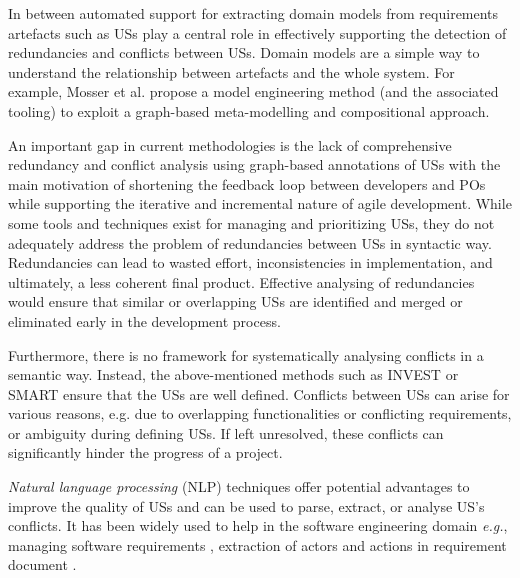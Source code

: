 
In between automated support for extracting domain models from requirements artefacts such as USs play a central role in effectively supporting the detection of redundancies and conflicts between USs. Domain models are a simple way to understand the relationship between artefacts and the whole system. For example, Mosser et al. propose a model engineering method (and the associated tooling) to exploit a graph-based meta-modelling and compositional approach\cite{mosser2022modelling}.

An important gap in current methodologies is the lack of comprehensive redundancy and conflict analysis using graph-based annotations of USs with the main motivation of shortening the feedback loop between developers and POs while supporting the iterative and incremental nature of agile development.
While some tools and techniques exist for managing and prioritizing USs\cite{sachdeva2018prioritizing}\cite{abdelazim2020framework}, they do not adequately address the problem of redundancies between USs in syntactic way. Redundancies can lead to wasted effort, inconsistencies in implementation, and ultimately, a less coherent final product. Effective analysing of redundancies would ensure that similar or overlapping USs are identified and merged or eliminated early in the development process.

Furthermore, there is no framework for systematically analysing conflicts in a semantic way. Instead, the above-mentioned methods such as INVEST or SMART ensure that the USs are well defined. Conflicts between USs can arise for various reasons, e.g. due to overlapping functionalities or conflicting requirements, or ambiguity during defining USs. If left unresolved, these conflicts can significantly hinder the progress of a project. %

\emph{Natural language processing} (NLP) techniques offer potential advantages to improve the quality of USs and can be used to parse, extract, or analyse US's conflicts. It has been widely used to help in the software engineering domain \emph{e.g.}, managing software requirements \cite{Arias2018}, extraction of actors and actions in requirement document \cite{al2018use}. 

